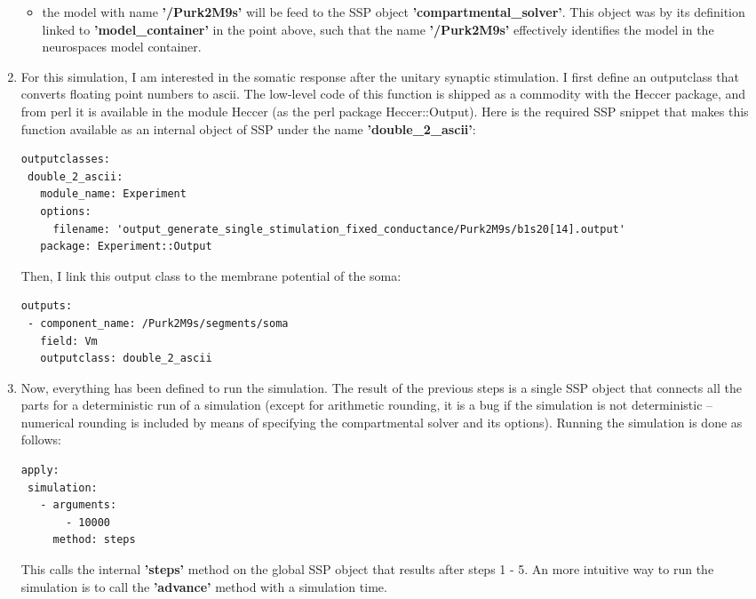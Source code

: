 \documentclass[12pt]{article}
\begin{document}
\begin{enumerate}
\begin{itemize}
  \item the model with name {\bf '/Purk2M9s'} will be feed to the SSP
    object {\bf 'compartmental\_solver'}.  This object was by its
    definition linked to {\bf 'model\_container'} in the point above,
    such that the name {\bf '/Purk2M9s'} effectively identifies the
    model in the neurospaces model container.
  \end{itemize}

\item For this simulation, I am interested in the somatic response
  after the unitary synaptic stimulation.  I first define an
  outputclass that converts floating point numbers to ascii.  The
  low-level code of this function is shipped as a commodity with the
  Heccer package, and from perl it is available in the module Heccer
  (as the perl package Heccer::Output).  Here is the required SSP
  snippet that makes this function available as an internal object of
  SSP under the name {\bf 'double\_2\_ascii'}:

\begin{verbatim}
outputclasses:
 double_2_ascii:
   module_name: Experiment
   options:
     filename: 'output_generate_single_stimulation_fixed_conductance/Purk2M9s/b1s20[14].output'
   package: Experiment::Output
\end{verbatim}

  Then, I link this output class to the membrane potential of the
  soma:

\begin{verbatim}
outputs:
 - component_name: /Purk2M9s/segments/soma
   field: Vm
   outputclass: double_2_ascii
\end{verbatim}

\item Now, everything has been defined to run the simulation.  The
  result of the previous steps is a single SSP object that connects
  all the parts for a deterministic run of a simulation (except for
  arithmetic rounding, it is a bug if the simulation is not
  deterministic -- numerical rounding is included by means of
  specifying the compartmental solver and its options).  Running the
  simulation is done as follows:

\begin{verbatim}
apply:
 simulation:
   - arguments:
       - 10000
     method: steps
\end{verbatim}

  This calls the internal {\bf 'steps'} method on the global SSP
  object that results after steps 1 - 5.  An more intuitive way to run
  the simulation is to call the {\bf 'advance'} method with a
  simulation time.


\end{enumerate}
\end{document}
